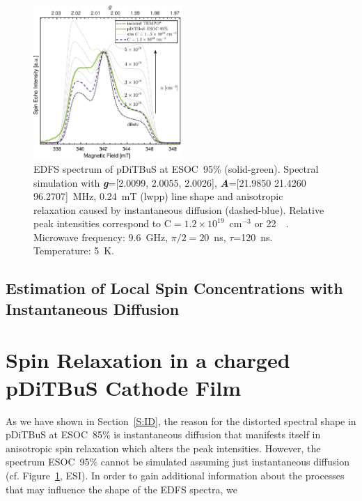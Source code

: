 \begin{figure}[ht!]
  \centering
	\includegraphics[width=0.5\textwidth]{./pulse/figures/Figure_S24.pdf}
	\caption{EDFS spectrum of pDiTBuS at ESOC~95\% (solid-green). Spectral simulation with \textit{\textbf{g}}=[2.0099, 2.0055, 2.0026], \textit{\textbf{A}}=[21.9850 21.4260 96.2707]~MHz, 0.24~mT (lwpp)  line shape and anisotropic relaxation caused by instantaneous diffusion (dashed-blue). Relative peak intensities correspond to C$=1.2\times10^{19}$~cm$^{-3}$ or 22~\si{\milli\Molar}. Microwave frequency: 9.6~GHz, $\pi/2=20$~ns, $\tau$=120~ns. Temperature: 5~K.}
	\label{fig:Figure_S_SIM_FSE_SOC95_ID}
\end{figure}

\newpage




\subsection{Estimation of Local Spin Concentrations with Instantaneous Diffusion}



\section{Spin Relaxation in a charged pDiTBuS Cathode Film}
\label{S:RELAX_TIMES}

As we have shown in Section~\ref{S:ID}, the reason for the distorted spectral shape in pDiTBuS at ESOC~85\% is instantaneous diffusion that manifests itself in anisotropic spin relaxation which alters the  peak intensities. However, the spectrum  ESOC~95\% cannot be simulated assuming just instantaneous diffusion (cf. Figure~\ref{fig:Figure_S_SIM_FSE_SOC95_ID}, ESI). In order to gain additional information about the processes that may influence the shape of the EDFS spectra, we \\

